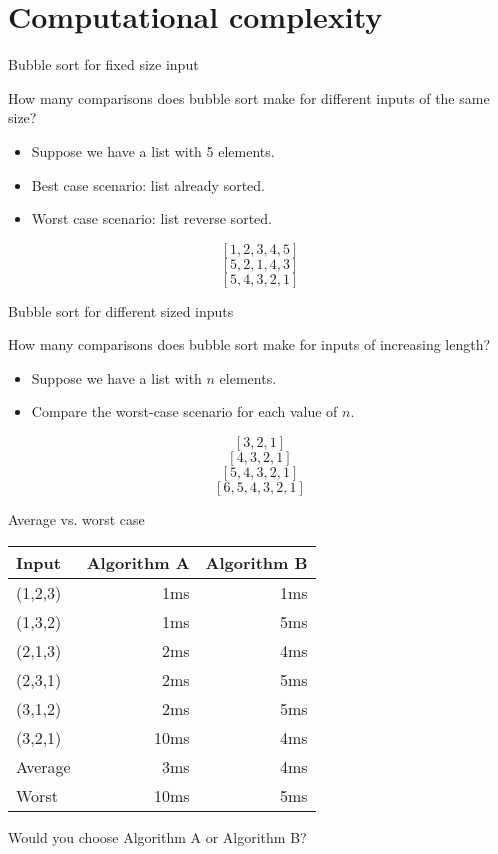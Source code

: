 


\section{Computational complexity}


\begin{frame}{Bubble sort for fixed size input}
  \begin{alertblock}{How many comparisons does bubble sort make for different inputs of the same size?}
    \begin{itemize}
      \item Suppose we have a list with 5 elements.
      \item Best case scenario: list already sorted.
      \item Worst case scenario: list reverse sorted.
    \end{itemize}
    \[ [1,2,3,4,5] \]
    \[ [5,2,1,4,3] \]
    \[ [5,4,3,2,1] \]
  \end{alertblock}
\end{frame}


\begin{frame}{Bubble sort for different sized inputs}
  \begin{alertblock}{How many comparisons does bubble sort make for inputs of increasing length?}
    \begin{itemize}
      \item Suppose we have a list with $n$ elements.
      \item Compare the worst-case scenario for each value of $n$.
    \end{itemize}
    \[ [3,2,1] \]
    \[ [4,3,2,1] \]
    \[ [5,4,3,2,1] \]
    \[ [6,5,4,3,2,1] \]
  \end{alertblock}
\end{frame}


\begin{frame}{Average vs. worst case}
  \begin{table}
    \begin{tabular}{p{2cm}rr}
      Input & Algorithm A & \hspace{1cm} Algorithm B \\
      \hline
      (1,2,3) &  1ms &  1ms \\
      (1,3,2) &  1ms &  5ms \\
      (2,1,3) &  2ms &  4ms \\
      (2,3,1) &  2ms &  5ms \\
      (3,1,2) &  2ms &  5ms \\
      (3,2,1) & 10ms &  4ms \\
      \hline
      Average &  3ms &  4ms \\
      Worst   & 10ms &  5ms
    \end{tabular}
  \end{table}
  \begin{center}
    Would you choose Algorithm A or Algorithm B?
  \end{center}
\end{frame}


